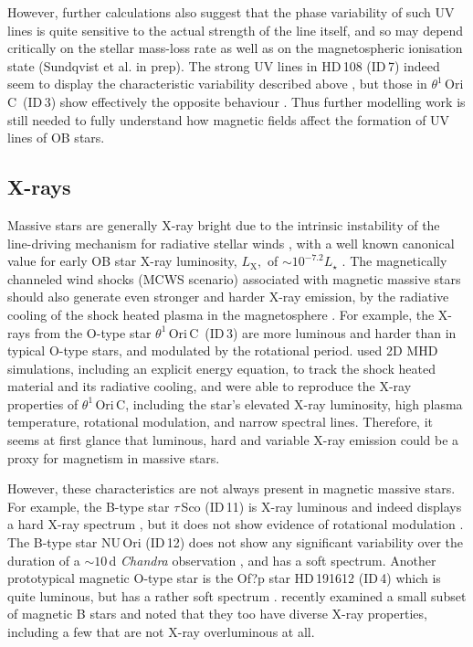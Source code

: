 \documentclass[useAMS,usenatbib]{mn2e}
\newcommand{\ls}{L_\star}
\newcommand{\lx}{L_\mathrm{X}}
\newcommand{\oriunc}{$\theta^1$\,Ori\,C}
\begin{document}
However, further calculations also suggest that the phase variability of such UV lines is quite sensitive to the actual strength of the line itself, and so may depend critically on the stellar mass-loss rate as well as on the magnetospheric ionisation state (Sundqvist et al. in prep). 
The strong UV lines in  HD\,108 (ID\,7) indeed seem to display the characteristic variability described above \citep{2012MNRAS.422.2314M}, but 
those in \oriunc\ (ID\,3) show effectively the opposite behaviour \citep{2008cihw.conf..125U}.
Thus further modelling work is still needed to fully understand how magnetic fields affect the formation of UV lines of OB stars.



\subsection{X-rays}
\label{sec:xray}



Massive stars are generally X-ray bright due to the intrinsic instability of the line-driving mechanism for radiative stellar winds \citep{1997A&A...322..878F,2002A&A...381.1015R,2003A&A...406L...1D}, with a well known canonical value for early OB star X-ray luminosity, $\lx,$ of $\sim10^{-7.2}\ls$ \citep{1997A&A...322..167B,2011ApJS..194....7N,2011ApJS..194....5G}. 
The magnetically channeled wind shocks (MCWS scenario) associated with magnetic massive stars should also generate even stronger and harder X-ray emission, by the radiative cooling of the shock heated plasma in the magnetosphere \citep{1997ApJ...485L..29B}. 
For example, the X-rays from the O-type star \oriunc\ (ID\,3) are more luminous and harder than in typical O-type stars, and modulated by the rotational period. \citet{2005ApJ...628..986G} used 2D MHD simulations, including an explicit energy equation, to track the shock heated material and its radiative cooling, and were able to reproduce the X-ray properties of \oriunc,  including the star's elevated X-ray luminosity, high plasma temperature, rotational modulation, and narrow spectral lines. Therefore, it seems at first glance that luminous, hard and variable X-ray emission could be a proxy for magnetism in massive stars. 

However, these characteristics are not always present in magnetic massive stars.
For example, the B-type star $\tau$\,Sco (ID\,11) is X-ray luminous and indeed displays a hard X-ray spectrum \citep{2003A&A...398..203M}, but it does not show evidence of rotational modulation \citep{2010ApJ...721.1412I}. 
The B-type star NU\,Ori (ID\,12) does not show any significant variability over the duration of a $\sim10$\,d \textit{Chandra} observation \citep{2005ApJS..160..557S}, and has a soft spectrum.
Another prototypical magnetic O-type star is the Of?p star HD\,191612 (ID\,4) which is quite luminous, but has a rather soft spectrum \citep{2010A&A...520A..59N}.  \citet{2011MNRAS.416.1456O} recently examined a small subset of magnetic B stars and noted that they too have diverse X-ray properties, including a few that are not X-ray overluminous at all. 
\end{document}
